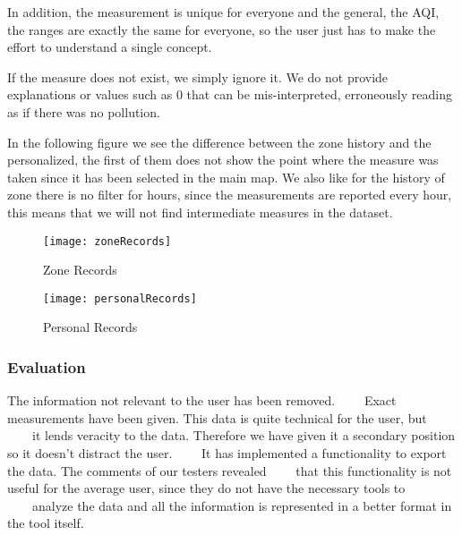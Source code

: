 In addition, the measurement is unique for everyone and the general, the AQI, the ranges are exactly the same for everyone, so the user just has to make the effort to understand a single concept.

If the measure does not exist, we simply ignore it. We do not provide explanations or values such as 0 that can be mis-interpreted, erroneously reading as if there was no pollution.


In the following figure we see the difference between the zone history and the personalized, the first of them does not show
the point where the measure was taken since it has been selected in the main map. We also like for the history of
zone there is no filter for hours, since the measurements are reported every hour, this means that we will not find
intermediate measures in the dataset.
\begin{figure}[ht]
    \centering
    \texttt{[image: zoneRecords]}
    \caption{Zone Records}
\end{figure}
\begin{figure}[ht]
    \centering
    \texttt{[image: personalRecords]}
    \caption{Personal Records}
\end{figure}

\subsubsection*{Evaluation}  

\begin{itemize}
    \done The information not relevant to the user has been removed.
    \crossed Exact measurements have been given. This data is quite technical for the user, but 
    it lends veracity to the data. Therefore we have given it a secondary position so it doesn't distract the user.
    \crossed It has implemented a functionality to export the data. The comments of our testers revealed
    that this functionality is not useful for the average user, since they do not have the necessary tools to
    analyze the data and all the information is represented in a better format in the tool itself.
\end{itemize}
